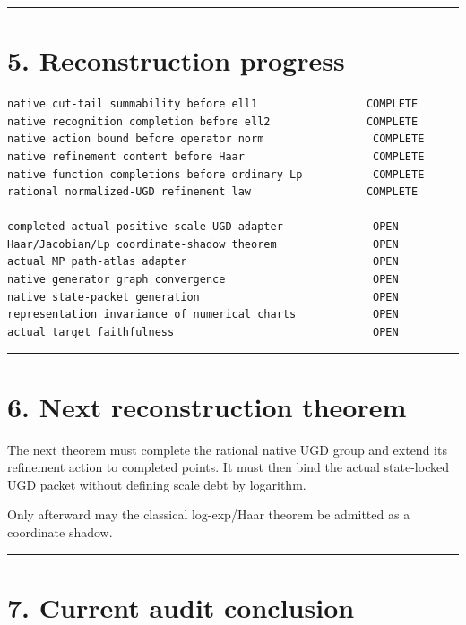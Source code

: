 \begin{center}\rule{0.5\linewidth}{0.5pt}\end{center}

\hypertarget{reconstruction-progress}{%
\section{5. Reconstruction progress}\label{reconstruction-progress}}

\begin{verbatim}
native cut-tail summability before ell1                 COMPLETE
native recognition completion before ell2               COMPLETE
native action bound before operator norm                 COMPLETE
native refinement content before Haar                    COMPLETE
native function completions before ordinary Lp           COMPLETE
rational normalized-UGD refinement law                  COMPLETE

completed actual positive-scale UGD adapter              OPEN
Haar/Jacobian/Lp coordinate-shadow theorem               OPEN
actual MP path-atlas adapter                             OPEN
native generator graph convergence                       OPEN
native state-packet generation                           OPEN
representation invariance of numerical charts            OPEN
actual target faithfulness                               OPEN
\end{verbatim}

\begin{center}\rule{0.5\linewidth}{0.5pt}\end{center}

\hypertarget{next-reconstruction-theorem}{%
\section{6. Next reconstruction theorem}\label{next-reconstruction-theorem}}

The next theorem must complete the rational native UGD group and extend its
refinement action to completed points. It must then bind the actual state-locked
UGD packet without defining scale debt by logarithm.

Only afterward may the classical log-exp/Haar theorem be admitted as a
coordinate shadow.

\begin{center}\rule{0.5\linewidth}{0.5pt}\end{center}

\hypertarget{current-audit-conclusion}{%
\section{7. Current audit conclusion}\label{current-audit-conclusion}}

